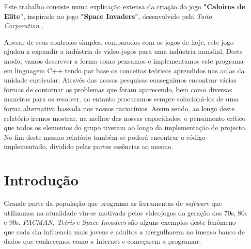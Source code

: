 \documentclass[a4paper,11pt]{article}
\newcommand\tab[1][0.8cm]{\hspace*{#1}}
\begin{document}
\tab Este trabalho consiste numa explicação extensa da criação do jogo \textbf{"Caloiros de Elite"}, inspirado no jogo \textbf{"Space Invaders"}, desenvolvido pela \textit{Taito Corporation} \cite{spaceInv}.  \par
\vspace{8pt}
Apesar de seus controlos simples,
comparados com os jogos de hoje, este jogo ajudou a expandir a indústria de video-jogos para
uma indústria mundial, 
Deste modo, vamos descrever a forma como pensamos e implementamos este programa em linguagem C++ tendo por base os conceitos teóricos aprendidos nas aulas da unidade curricular.
Através das nossas pesquisas conseguimos encontrar várias formas de contornar os problemas que
foram aparecendo, bem como diversas maneiras para os resolver, no entanto procuramos sempre
solucioná-los de uma forma alternativa baseada nos nossos raciocínios. Assim sendo, ao longo
deste relatório iremos mostrar, na melhor das nossas capacidades, o pensamento crítico que todos os elementos do grupo tiveram ao longo da implementação do projecto. No fim
deste mesmo relatório também se poderá encontrar o código implementado, dividido pelas partes
essências ao mesmo.

\vspace{40pt}


\pagebreak

\pagebreak


\renewcommand{\contentsname}{Índice}        %
\tableofcontents
{}

\vspace{40pt}
\listoffigures

\vspace{40pt}
\listoftables

\pagebreak


\setcounter{secnumdepth}{3}


\section{Introdução}\label{Intro}

\setcounter{page}{1}
\tab

\vspace{8pt}

Grande parte da população que programa as ferramentas de \textit{software} que utilizamos na atualidade viu-se motivada pelos videojogos da geração dos 70s, 80s e 90s. \textit{PACMAN, Tetris} e \textit{Space Invaders} são alguns exemplos deste fenómeno que cada dia influencia mais jovens e adultos a mergulharem no imenso banco de dados que conhecemos como a Internet e começarem a programar.
\end{document}
